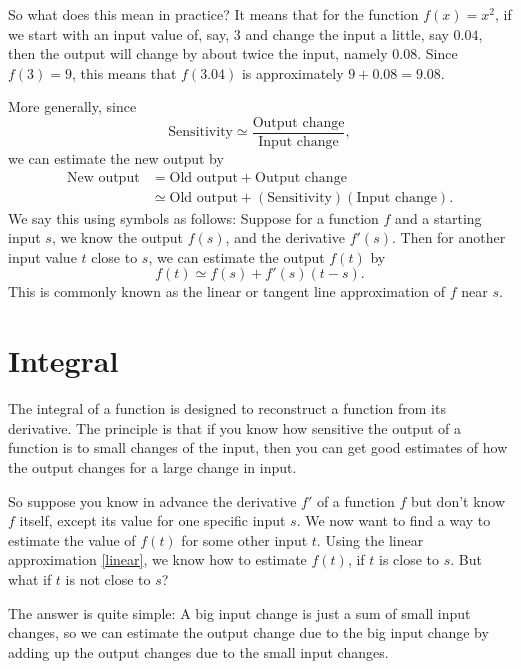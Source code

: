\documentclass{math-deane}
\begin{document}
So what does this mean in practice? It means that for the function $f(x) = x^2$, if we start with an input value of, say, $3$ and change the input a little, say $0.04$, then the output will change by about twice the input, namely $0.08$. Since $f(3) = 9$, this means that $f(3.04)$ is approximately $9 + 0.08 = 9.08$.

More generally, since
\[
\text{Sensitivity} \simeq \frac{\text{Output change}}{\text{Input change}},
\]
we can estimate the new output by
\begin{align*}
\text{New output} &= \text{Old output} + \text{Output change}\\
&\simeq \text{Old output} + (\text{Sensitivity})(\text{Input change}).
\end{align*}
We say this using symbols as follows: Suppose for a function $f$ and a starting input $s$, we know the output $f(s)$, and the derivative $f'(s)$. Then for another input value $t$ close to $s$, we can estimate the output $f(t)$ by
\begin{equation}\label{linear}
f(t) \simeq f(s) + f'(s)(t-s).
\end{equation}
This is commonly known as the linear or tangent line approximation of $f$ near $s$.

\section{Integral}

The integral of a function is designed to reconstruct a function from its derivative. The principle is that if you know how sensitive the output of a function is to small changes of the input, then you can get good estimates of how the output changes for a large change in input.

So suppose you know in advance the derivative $f'$ of a function $f$ but don't know $f$ itself, except its value for one specific input $s$. We now want to find a way to estimate the value of $f(t)$ for some other input $t$. Using the linear approximation \eqref{linear}, we know how to estimate $f(t)$, if $t$ is close to $s$. But what if $t$ is not close to $s$?

The answer is quite simple: A big input change is just a sum of small input changes, so we can estimate the output change due to  the big input change by adding up the output changes due to the small input changes.
\end{document}
